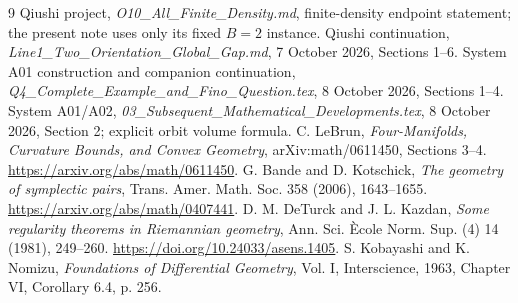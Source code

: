 \documentclass[11pt,a4paper]{article}
\theoremstyle{definition}\newtheorem{assumption}[theorem]{Input}
\theoremstyle{remark}\newtheorem{remark}[theorem]{Remark}
\numberwithin{equation}{section}
\begin{document}
\begin{thebibliography}{9}
 Qiushi project, \emph{O10\_All\_Finite\_Density.md}, finite-density endpoint statement; the present note uses only its fixed $B=2$ instance.
 Qiushi continuation, \emph{Line1\_Two\_Orientation\_Global\_Gap.md}, 7 October 2026, Sections 1--6.
 System A01 construction and companion continuation, \emph{Q4\_Complete\_Example\_and\_Fino\_Question.tex}, 8 October 2026, Sections 1--4.
 System A01/A02, \emph{03\_Subsequent\_Mathematical\_Developments.tex}, 8 October 2026, Section 2; explicit orbit volume formula.
 C. LeBrun, \emph{Four-Manifolds, Curvature Bounds, and Convex Geometry}, arXiv:math/0611450, Sections 3--4. \url{https://arxiv.org/abs/math/0611450}.
 G. Bande and D. Kotschick, \emph{The geometry of symplectic pairs}, Trans. Amer. Math. Soc. 358 (2006), 1643--1655. \url{https://arxiv.org/abs/math/0407441}.
 D. M. DeTurck and J. L. Kazdan, \emph{Some regularity theorems in Riemannian geometry}, Ann. Sci. \`Ecole Norm. Sup. (4) 14 (1981), 249--260. \url{https://doi.org/10.24033/asens.1405}.
 S. Kobayashi and K. Nomizu, \emph{Foundations of Differential Geometry}, Vol. I, Interscience, 1963, Chapter VI, Corollary 6.4, p. 256.
\end{thebibliography}
\end{document}
